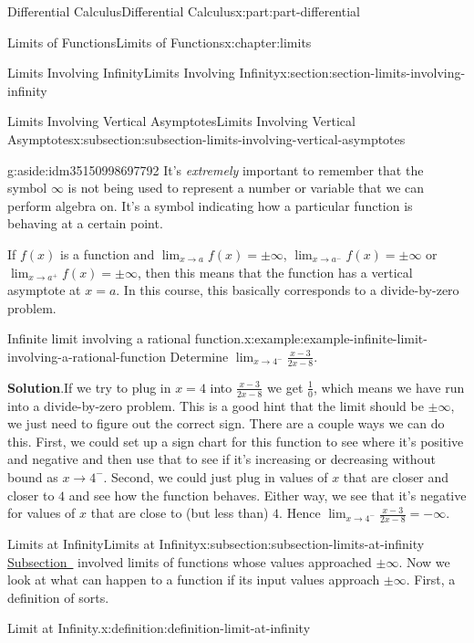 \documentclass[twoside,10pt,]{book}
\newcommand{\blocktitlefont}{\relax}
\numberwithin{equation}{part}
\begin{document}
\begin{partptx}{Differential Calculus}{}{Differential Calculus}{}{}{x:part:part-differential}
\begin{chapterptx}{Limits of Functions}{}{Limits of Functions}{}{}{x:chapter:limits}
\begin{sectionptx}{Limits Involving Infinity}{}{Limits Involving Infinity}{}{}{x:section:section-limits-involving-infinity}
\begin{subsectionptx}{Limits Involving Vertical Asymptotes}{}{Limits Involving Vertical Asymptotes}{}{}{x:subsection:subsection-limits-involving-vertical-asymptotes}
\begin{aside}{}{g:aside:idm35150998697792}%
It's \emph{extremely} important to remember that the symbol \(\infty\) is not being used to represent a number or variable that we can perform algebra on. It's a symbol indicating how a particular function is behaving at a certain point.%
\end{aside}
If \(f(x)\) is a function and \(\lim_{x\to a}f(x)=\pm\infty\), \(\lim_{x\to a^{-}}f(x)=\pm\infty\) or \(\lim_{x\to a^{+}}f(x)=\pm\infty\), then this means that the function has a vertical asymptote at \(x=a\). In this course, this basically corresponds to a divide-by-zero problem.%
\begin{example}{Infinite limit involving a rational function.}{x:example:example-infinite-limit-involving-a-rational-function}%
Determine \(\lim_{x\to4^{-}}\frac{x-3}{2x-8}\).%
\par\smallskip%
\noindent\textbf{\blocktitlefont Solution}.\hypertarget{g:solution:idm35150998693056}{}\quad{}If we try to plug in \(x=4\) into \(\frac{x-3}{2x-8}\) we get \(\frac{1}{0}\), which means we have run into a divide-by-zero problem. This is a good hint that the limit should be \(\pm\infty\), we just need to figure out the correct sign. There are a couple ways we can do this. First, we could set up a sign chart for this function to see where it's positive and negative and then use that to see if it's increasing or decreasing without bound as \(x\to4^{-}\). Second, we could just plug in values of \(x\) that are closer and closer to \(4\) and see how the function behaves. Either way, we see that it's negative for values of \(x\) that are close to (but less than) \(4\). Hence \(\lim_{x\to4^{-}}\frac{x-3}{2x-8}=-\infty\).%
\end{example}
\end{subsectionptx}
%
%
\typeout{************************************************}
\typeout{************************************************}
%
\begin{subsectionptx}{Limits at Infinity}{}{Limits at Infinity}{}{}{x:subsection:subsection-limits-at-infinity}
\hyperref[x:subsection:subsection-limits-involving-vertical-asymptotes]{Subsection~} involved limits of functions whose values approached \(\pm\infty\). Now we look at what can happen to a function if its input values approach \(\pm\infty\). First, a definition of sorts.%
\begin{definition}{Limit at Infinity.}{x:definition:definition-limit-at-infinity}%

\end{definition}
\end{subsectionptx}
\end{sectionptx}
\end{chapterptx}
\end{partptx}
\end{document}
